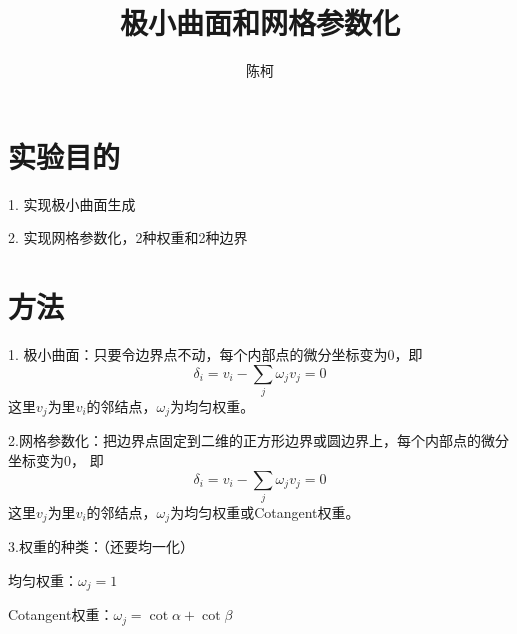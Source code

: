 \documentclass{article}
\title{极小曲面和网格参数化}
\author{陈柯}
\begin{document}
	\maketitle
	
	\section{实验目的}
	
	1.	实现极小曲面生成
	
	2.  实现网格参数化，2种权重和2种边界
	
	\section{方法}
	1. 极小曲面：只要令边界点不动，每个内部点的微分坐标变为0，即
	$$\delta_i=v_i-\sum_{j}\omega_jv_j=0$$
	这里$v_j$为里$v_i$的邻结点，$\omega_j$为均匀权重。
	
	2.网格参数化：把边界点固定到二维的正方形边界或圆边界上，每个内部点的微分坐标变为0，
	即$$\delta_i=v_i-\sum_{j}\omega_jv_j=0$$
	这里$v_j$为里$v_i$的邻结点，$\omega_j$为均匀权重或Cotangent权重。
	
	3.权重的种类：（还要均一化）
	
	均匀权重：$\omega_j=1$
	
	Cotangent权重：$\omega_j=\cot{\alpha}+\cot{\beta}$
	\clearpage
\end{document}
